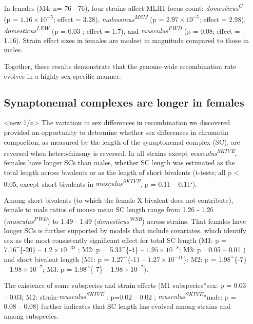 \documentclass[
]{article}
\begin{document}
In females (M4; n= 76 - 76), four strains affect MLH1 focus count:
\emph{domesticus\textsuperscript{G}} (p =
\ensuremath{1.16\times 10^{-5}}; effect = 3.28),
\emph{molossinus\textsuperscript{MSM}} (p =
\ensuremath{2.97\times 10^{-5}}; effect = 2.98),
\emph{domesticus\textsuperscript{LEW}} (p = 0.03 ; effect = 1.7), and
\emph{musculus\textsuperscript{PWD}} (p = 0.08; effect = 1.16). Strain
effect sizes in females are modest in magnitude compared to those in
males.

Together, these results demonstrate that the genome-wide recombination
rate evolves in a highly sex-specific manner.

\hypertarget{synaptonemal-complexes-are-longer-in-females}{%
\subsection{Synaptonemal complexes are longer in
females}\label{synaptonemal-complexes-are-longer-in-females}}

\textless new 1/n\textgreater{} The variation in sex differences in
recombination we discovered provided an opportunity to determine whether
sex differences in chromatin compaction, as measured by the length of
the synaptonemal complex (SC), are reversed when heterochiasmy is
reversed. In all strains except \emph{musculus\textsuperscript{SKIVE}},
females have longer SCs than males, whether SC length was estimated as
the total length across bivalents or as the length of short bivalents
(t-tests; all p \textless{} 0.05, except short bivalents in
\emph{musculus\textsuperscript{SKIVE}}, p = 0.11 -- 0.11`).

Among short bivalents (to which the female X bivalent does not
contribute), female to male ratios of mouse mean SC length range from
1.26 - 1.26 (\emph{musculus\textsuperscript{PWD}}) to 1.49 - 1.49
(\emph{domesticus\textsuperscript{WSB}}) across strains. That females
have longer SCs is further supported by models that include covariates,
which identify sex as the most consistently significant effect for total
SC length (M1: p = 7.16\^{}\{-20\} -- \ensuremath{1.2\times 10^{-31}} ;
M2: p = 5.33\^{}\{-4\} -- \ensuremath{1.95\times 10^{-8}}; M3: p =0.05
-- 0.01 ) and short bivalent length (M1: p = 1.27\^{}\{-11 --
\ensuremath{1.27\times 10^{-11}}\}; M2: p = 1.98\^{}\{-7\} --
\ensuremath{1.98\times 10^{-7}}; M3: p = 1.98\^{}\{-7\} --
\ensuremath{1.98\times 10^{-7}}).

The existence of some subspecies and strain effects (M1 subspecies*sex:
p = 0.03 -- 0.03; M2: strain-\emph{musculus\textsuperscript{SKIVE}} :
p=0.02 -- 0.02 ; \emph{musculus\textsuperscript{SKIVE}}*male: p = 0.08
-- 0.08) further indicates that SC length has evolved among strains and
among subspecies.
\end{document}
